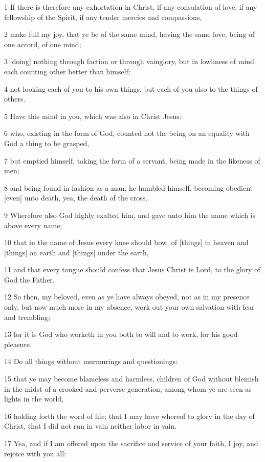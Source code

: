 \par 1 If there is therefore any exhortation in Christ, if any consolation of love, if any fellowship of the Spirit, if any tender mercies and compassions,
\par 2 make full my joy, that ye be of the same mind, having the same love, being of one accord, of one mind;
\par 3 [doing] nothing through faction or through vainglory, but in lowliness of mind each counting other better than himself;
\par 4 not looking each of you to his own things, but each of you also to the things of others.
\par 5 Have this mind in you, which was also in Christ Jesus:
\par 6 who, existing in the form of God, counted not the being on an equality with God a thing to be grasped,
\par 7 but emptied himself, taking the form of a servant, being made in the likeness of men;
\par 8 and being found in fashion as a man, he humbled himself, becoming obedient [even] unto death, yea, the death of the cross.
\par 9 Wherefore also God highly exalted him, and gave unto him the name which is above every name;
\par 10 that in the name of Jesus every knee should bow, of [things] in heaven and [things] on earth and [things] under the earth,
\par 11 and that every tongue should confess that Jesus Christ is Lord, to the glory of God the Father.
\par 12 So then, my beloved, even as ye have always obeyed, not as in my presence only, but now much more in my absence, work out your own salvation with fear and trembling;
\par 13 for it is God who worketh in you both to will and to work, for his good pleasure.
\par 14 Do all things without murmurings and questionings:
\par 15 that ye may become blameless and harmless, children of God without blemish in the midst of a crooked and perverse generation, among whom ye are seen as lights in the world,
\par 16 holding forth the word of life; that I may have whereof to glory in the day of Christ, that I did not run in vain neither labor in vain.
\par 17 Yea, and if I am offered upon the sacrifice and service of your faith, I joy, and rejoice with you all:
